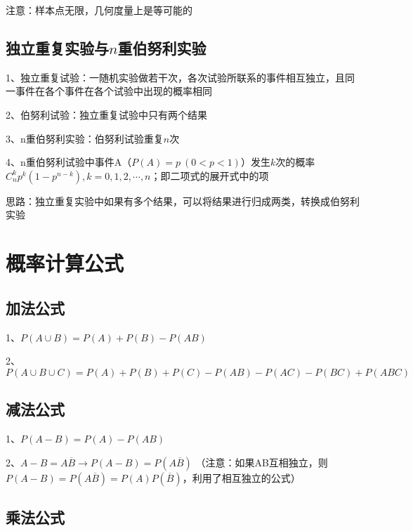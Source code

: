 注意：样本点无限，几何度量上是等可能的



\subsection{独立重复实验与$n$重伯努利实验}

1、独立重复试验：一随机实验做若干次，各次试验所联系的事件相互独立，且同一事件在各个事件在各个试验中出现的概率相同

2、伯努利试验：独立重复试验中只有两个结果

3、n重伯努利实验：伯努利试验重复$n$次

4、n重伯努利试验中事件A（$P(A) = p \ (0<p<1)$）发生$k$次的概率$C_n^kp^k(1-p^{n-k}),k=0,1,2,\cdots ,n$；即二项式的展开式中的项

思路：独立重复实验中如果有多个结果，可以将结果进行归成两类，转换成伯努利实验



\section{概率计算公式}



\subsection{加法公式}

1、$P(A\cup B) = P(A)+P(B)-P(AB)$

2、$P(A\cup B \cup C) = P(A)+P(B)+P(C)-P(AB)-P(AC)-P(BC)+P(ABC)$



\subsection{减法公式}

1、$P(A - B) = P(A)-P(AB)$

2、$A-B=A\overline B \rightarrow P(A-B) = P(A\overline B)$ （注意：如果AB互相独立，则$P(A-B) = P(A\overline B)=P(A)P(\overline B)$，利用了相互独立的公式）



\subsection{乘法公式}

